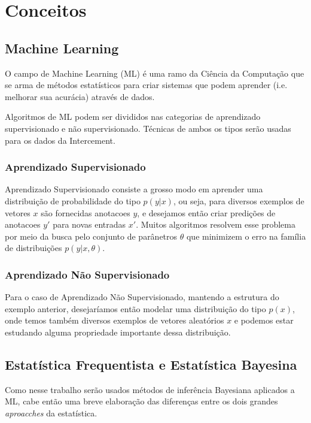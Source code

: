 \chapter{Conceitos}
\label{cap:conceitos}


\section{Machine Learning}

O campo de Machine Learning (ML) é uma ramo da Ciência da Computação que se arma de métodos estatísticos para criar sistemas que podem aprender (i.e. melhorar sua acurácia) através de dados.

Algoritmos de ML podem ser divididos nas categorias de aprendizado supervisionado e não supervisionado. Técnicas de ambos os tipos serão usadas para os dados da Intercement.

\subsection{Aprendizado Supervisionado}

Aprendizado Supervisionado consiste a grosso modo em aprender uma distribuição de probabilidade do tipo $p(y | x)$, ou seja, para diversos exemplos de vetores $x$ são fornecidas anotacoes $y$, e desejamos então criar predições de anotacoes $y'$ para novas entradas $x'$. Muitos algoritmos resolvem esse problema por meio da busca pelo conjunto de parânetros $\theta$ que minimizem o erro na família de distribuições $p(y | x,\theta)$.

\subsection{Aprendizado Não Supervisionado}

Para o caso de Aprendizado Não Supervisionado, mantendo a estrutura do exemplo anterior, desejaríamos então modelar uma distribuição do tipo $p(x)$, onde temos também diversos exemplos de vetores aleatórios $x$ e podemos estar estudando alguma propriedade importante dessa distribuição.

\section{Estatística Frequentista e Estatística Bayesina}

Como nesse trabalho serão usados métodos de inferência Bayesiana aplicados a ML, cabe então uma breve elaboração das diferenças entre os dois grandes \textit{aproacches} da estatística.\\


